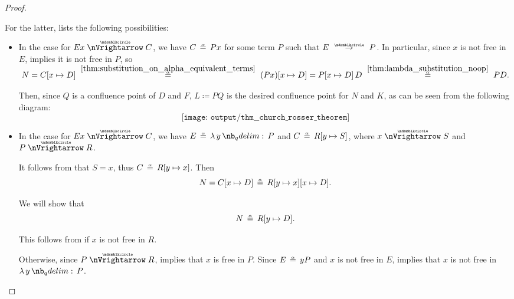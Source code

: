 \begin{proof}
\begin{itemize}
\begin{itemize}
\begin{itemize}
        For the latter,  lists the following possibilities:
        \begin{itemize}
          \item In the case  for \( Ex \ppred C \), we have \( C \aequiv Px \) for some term \( P \) such that \( E \pred P \). In particular, since \( x \) is not free in \( E \),  implies it is not free in \( P \), so
          \begin{equation*}
            N
            =
            C[x \mapsto D]
            \reloset {\ref{thm:substitution_on_alpha_equivalent_terms}} \aequiv
            (Px)[x \mapsto D]
            =
            P[x \mapsto D] \thinspace D
            \reloset {\ref{thm:lambda_substitution_noop}} \aequiv
            PD.
          \end{equation*}

          Then, since \( Q \) is a confluence point of \( D \) and \( F \), \( L \coloneqq PQ \) is the desired confluence point for \( N \) and \( K \), as can be seen from the following diagram:
          \begin{equation*}
            \texttt{[image: output/thm\_\_church\_rosser\_theorem]}
          \end{equation*}

          \item In the case  for \( Ex \ppred C \), we have \( E \aequiv \qabs y P \) and \( C \aequiv R[y \mapsto S] \), where \( x \ppred S \) and \( P \ppred R \).

          It follows from  that \( S = x \), thus \( C \aequiv R[y \mapsto x] \). Then
          \begin{equation*}
            N = C[x \mapsto D] \aequiv R[y \mapsto x][x \mapsto D].
          \end{equation*}

          We will show that
          \begin{equation*}
            N \aequiv R[y \mapsto D].
          \end{equation*}

          This follows from  if \( x \) is not free in \( R \).

          Otherwise, since \( P \ppred R \),  implies that \( x \) is free in \( P \). Since \( E \aequiv y P \) and \( x \) is not free in \( E \),  implies that \( x \) is not free in \( \qabs y P \).


\end{itemize}
\end{itemize}
\end{itemize}
\end{itemize}
\end{proof}
